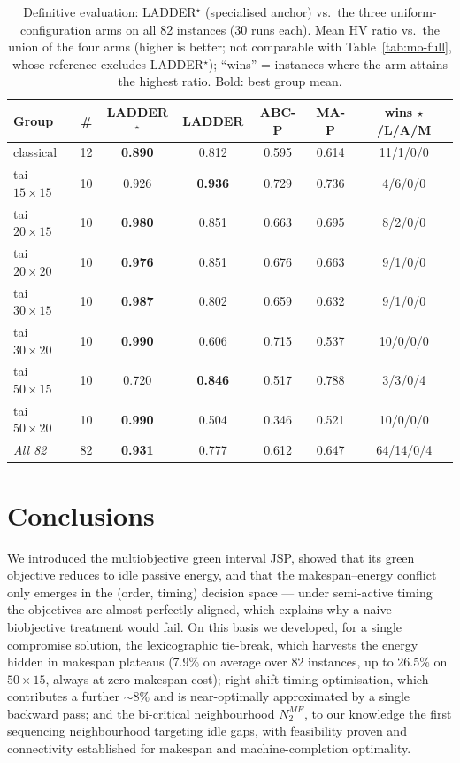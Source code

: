 \documentclass[preprint,12pt]{elsarticle}
\begin{document}
\begin{table}[htb]
\centering\small
\caption{Definitive evaluation: LADDER$^\star$ (specialised anchor) vs.\
the three uniform-configuration arms on all 82 instances (30 runs each).
Mean HV ratio vs.\ the union of the four arms (higher is better; not
comparable with Table~\ref{tab:mo-full}, whose reference excludes
LADDER$^\star$); ``wins'' = instances where the arm attains the highest
ratio. Bold: best group mean.}
\label{tab:star}
\begin{tabular}{l r cccc c}
\toprule
Group & \# & LADDER$^\star$ & LADDER & ABC-P & MA-P & wins $\star$/L/A/M \\
\midrule
classical      & 12 & \textbf{0.890} & 0.812 & 0.595 & 0.614 & 11/1/0/0 \\
tai $15{\times}15$ & 10 & 0.926 & \textbf{0.936} & 0.729 & 0.736 & 4/6/0/0 \\
tai $20{\times}15$ & 10 & \textbf{0.980} & 0.851 & 0.663 & 0.695 & 8/2/0/0 \\
tai $20{\times}20$ & 10 & \textbf{0.976} & 0.851 & 0.676 & 0.663 & 9/1/0/0 \\
tai $30{\times}15$ & 10 & \textbf{0.987} & 0.802 & 0.659 & 0.632 & 9/1/0/0 \\
tai $30{\times}20$ & 10 & \textbf{0.990} & 0.606 & 0.715 & 0.537 & 10/0/0/0 \\
tai $50{\times}15$ & 10 & 0.720 & \textbf{0.846} & 0.517 & 0.788 & 3/3/0/4 \\
tai $50{\times}20$ & 10 & \textbf{0.990} & 0.504 & 0.346 & 0.521 & 10/0/0/0 \\
\midrule
\textit{All 82} & 82 & \textbf{0.931} & 0.777 & 0.612 & 0.647 & 64/14/0/4 \\
\bottomrule
\end{tabular}
\end{table}

\section{Conclusions}
\label{sec:conclusions}

We introduced the multiobjective green interval JSP, showed that its green
objective reduces to idle passive energy, and that the makespan--energy
conflict only emerges in the (order, timing) decision space --- under
semi-active timing the objectives are almost perfectly aligned, which
explains why a naive biobjective treatment would fail. On this basis we
developed, for a single compromise solution, the lexicographic tie-break,
which harvests the energy hidden in makespan plateaus (7.9\% on average over
82 instances, up to 26.5\% on $50{\times}15$, always at zero makespan cost);
right-shift timing optimisation, which contributes a further ${\sim}8\%$ and
is near-optimally approximated by a single backward pass; and the bi-critical
neighbourhood $N_2^{ME}$, to our knowledge the first sequencing
neighbourhood targeting idle
gaps, with feasibility proven and connectivity established for makespan and
machine-completion optimality.
\end{document}
